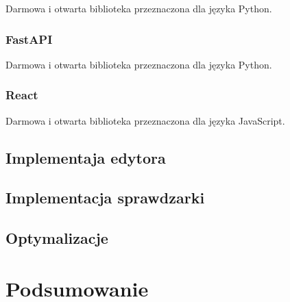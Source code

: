 \documentclass[a4paper,12pt,oneside]{book}
\theoremstyle{definition}
\begin{document}
Darmowa i otwarta biblioteka przeznaczona dla języka Python.

\lipsum[1]

\lipsum[2]

\lipsum[3]

\subsection{FastAPI}

Darmowa i otwarta biblioteka przeznaczona dla języka Python.

\lipsum[1]

\lipsum[2]

\lipsum[3]

\subsection{React}

Darmowa i otwarta biblioteka przeznaczona dla języka JavaScript.

\lipsum[1]

\lipsum[2]

\lipsum[3]

\section{Implementaja edytora}

\lipsum[1]

\lipsum[2]

\lipsum[3]

\section{Implementacja sprawdzarki}

\lipsum[1]

\lipsum[2]

\lipsum[3]

\section{Optymalizacje}

\lipsum[1]

\lipsum[2]

\lipsum[3]

\lipsum[4]

\chapter*{Podsumowanie}
\end{document}
